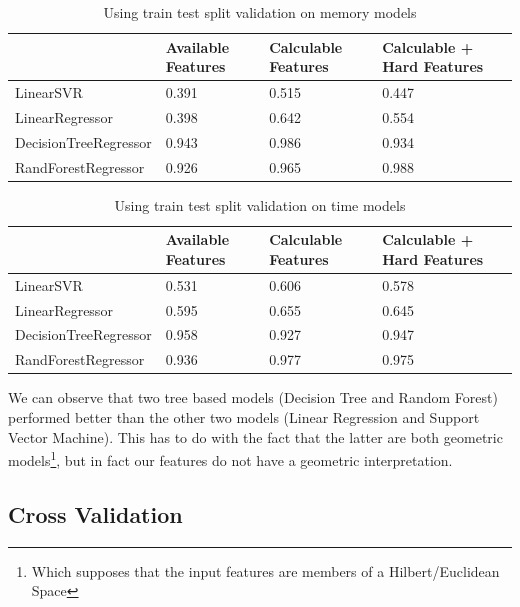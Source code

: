 \begin{table}[ht]
    \centering
    \begin{tabularx}{\textwidth}{| X |  X | X | X |}
        \hline
        & Available Features &  Calculable Features & Calculable + Hard Features \\
		\hline
        LinearSVR              & 0.391       & 0.515        &   0.447    \\ \hline
        LinearRegressor        & 0.398       & 0.642        &   0.554    \\ \hline
        DecisionTreeRegressor  & 0.943       & 0.986        &   0.934    \\ \hline
        RandForestRegressor    & 0.926       & 0.965        &   0.988    \\ \hline
    \end{tabularx}
    \caption{Using train test split validation on memory models}
\end{table}


\begin{table}[ht]
    \centering
    \begin{tabularx}{\textwidth}{| X |  X | X | X |}
        \hline
        & Available Features &  Calculable Features & Calculable + Hard Features \\
		\hline
        LinearSVR              & 0.531    & 0.606   &   0.578  \\ \hline
        LinearRegressor        & 0.595    & 0.655   &   0.645  \\ \hline
        DecisionTreeRegressor  & 0.958    & 0.927   &   0.947  \\ \hline
        RandForestRegressor    & 0.936    & 0.977   &   0.975  \\ \hline
    \end{tabularx}
    \caption{Using train test split validation on time models}
\end{table}

We can observe that two tree based models (Decision Tree and Random Forest) performed better than the other two models (Linear Regression and Support Vector Machine). This has to do with the fact that the latter are both geometric models\footnote{Which supposes that the input features are members of a Hilbert/Euclidean Space}, but in fact our features do not have a geometric interpretation.

\subsection{Cross Validation}

